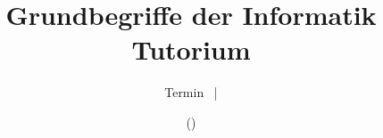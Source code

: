
\usepackage[deutsch,titlepage0]{../TutTexbib/KIT/beamerthemeKITmod}

\usepackage{pdfpages}

\usepackage{libertine}

\usepackage{eulervm}

\usepackage[ngerman]{babel}



\usepackage{csquotes}

\usepackage{amsmath, amsfonts, amssymb}

\setcounter{tocdepth}{1}

\usepackage[TS1,T1]{fontenc}

\usepackage{array}
\usepackage{multicol}

\usepackage{graphicx}


\usepackage{hyperref}
\hypersetup{bookmarksdepth=subsection} 

\usepackage{colortbl}
\usepackage[absolute,overlay]{textpos}
\usepackage{listings}
\usepackage{forloop}

\usepackage{tikz}
\usetikzlibrary{matrix}
\usetikzlibrary{arrows.meta}
\usetikzlibrary{automata}
\usetikzlibrary{tikzmark}

\usepackage{xspace}





\title[GBI-Tutorium, Woche \theweeknum]{Grundbegriffe der Informatik \\ Tutorium \mytutnumber}

\subtitle{Termin \theweeknum \ | \mydate{\theweeknum} \\ \myname}
\author[\myname]{\myname (\mailto{\mymail})}
\date{\mydate{\theweeknum}\ }

